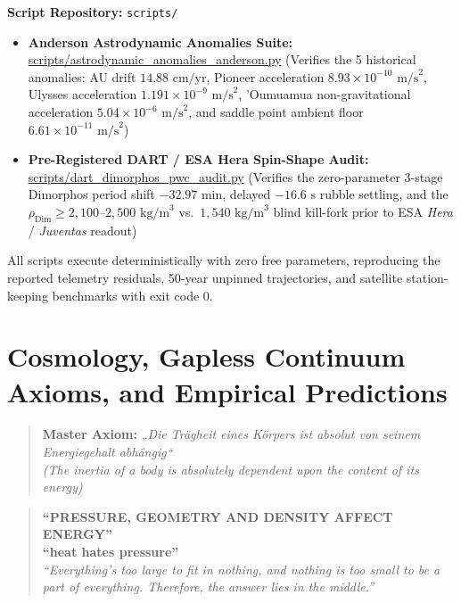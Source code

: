 \documentclass[11pt,a4paper]{article}
\begin{document}
\begin{tcolorbox}[colback=green!5!white,colframe=green!60!black,title={Python Verification Callout 7.3: Astrodynamic Anomalies and Anderson Equation of State}]
\textbf{Script Repository:} \texttt{scripts/}
\begin{itemize}
    \item \textbf{Anderson Astrodynamic Anomalies Suite:} \url{scripts/astrodynamic_anomalies_anderson.py} (Verifies the 5 historical anomalies: AU drift $14.88\text{ cm/yr}$, Pioneer acceleration $8.93 \times 10^{-10}\text{ m/s}^2$, Ulysses acceleration $1.191 \times 10^{-9}\text{ m/s}^2$, 'Oumuamua non-gravitational acceleration $5.04 \times 10^{-6}\text{ m/s}^2$, and saddle point ambient floor $6.61 \times 10^{-11}\text{ m/s}^2$)
    \item \textbf{Pre-Registered DART / ESA Hera Spin-Shape Audit:} \url{scripts/dart_dimorphos_pwc_audit.py} (Verifies the zero-parameter 3-stage Dimorphos period shift $-32.97\text{ min}$, delayed $-16.6\text{ s}$ rubble settling, and the $\rho_{\text{Dim}} \ge 2{,}100\text{--}2{,}500\text{ kg/m}^3$ vs.~$1{,}540\text{ kg/m}^3$ blind kill-fork prior to ESA \textit{Hera} / \textit{Juventas} readout)
\end{itemize}
All scripts execute deterministically with zero free parameters, reproducing the reported telemetry residuals, 50-year unpinned trajectories, and satellite station-keeping benchmarks with exit code 0.
\end{tcolorbox}


\section{Cosmology, Gapless Continuum Axioms, and Empirical Predictions}
\label{sec:cosmology_gapless}

\begin{quote}
\centering
\textbf{Master Axiom:} \textit{„Die Trägheit eines Körpers ist absolut von seinem Energiegehalt abhängig“}\\
\textit{(The inertia of a body is absolutely dependent upon the content of its energy)}
\end{quote}

\begin{quote}
\centering
\textbf{``PRESSURE, GEOMETRY AND DENSITY AFFECT ENERGY''}\\
\textbf{``heat hates pressure''}\\
\textit{``Everything's too large to fit in nothing, and nothing is too small to be a part of everything. Therefore, the answer lies in the middle.''}
\end{quote}
\end{document}
